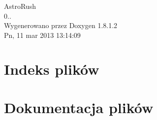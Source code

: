 \documentclass{book}
\begin{document}
\hypersetup{pageanchor=false,citecolor=blue}
\begin{titlepage}
\vspace*{7cm}
\begin{center}
{\Large Astro\-Rush \\[1ex]\large 0.. }\\
\vspace*{1cm}
{\large Wygenerowano przez Doxygen 1.8.1.2}\\
\vspace*{0.5cm}
{\small Pn, 11 mar 2013 13:14:09}\\
\end{center}
\end{titlepage}
\clearemptydoublepage
{}
\tableofcontents
\clearemptydoublepage
{}
\hypersetup{pageanchor=true,citecolor=blue}
\chapter{Indeks plików}

\chapter{Dokumentacja plików}
























\printindex
\end{document}
